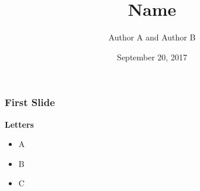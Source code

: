 \documentclass[compress]{beamer}
\title[Name of Presentation Slides]{Name}
\author[Author A and Author B]{Author A and Author B}
\date[September 20, 2017]{September 20, 2017}
\begin{document}
\begin{frame}
\frametitle{First Slide}
\textbf{Letters}
\begin{itemize}
    \item A
    \item B
    \item C
\end{itemize}

\end{frame}
\end{document}
